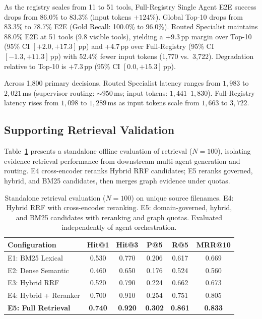 As the registry scales from 11 to 51 tools, Full-Registry Single Agent E2E success drops from 86.0\% to 83.3\% (input tokens $+124\%$). Global Top-10 drops from 83.3\% to 78.7\% E2E (Gold Recall: 100.0\% to 96.0\%). Routed Specialist maintains 88.0\% E2E at 51 tools (9.8 visible tools), yielding a +9.3\,pp margin over Top-10 (95\% CI $[+2.0, +17.3]$\,pp) and +4.7\,pp over Full-Registry (95\% CI $[-1.3, +11.3]$\,pp) with 52.4\% fewer input tokens (1{,}770 vs.\ 3{,}722). Degradation relative to Top-10 is $+7.3$\,pp (95\% CI $[0.0, +15.3]$\,pp).

Across 1,800 primary decisions, Routed Specialist latency ranges from $1{,}983$ to $2{,}021$\,ms (supervisor routing: ${\sim}950$\,ms; input tokens: $1{,}441$--$1{,}830$). Full-Registry latency rises from $1{,}098$ to $1{,}289$\,ms as input tokens scale from $1{,}663$ to $3{,}722$.

\subsection{Supporting Retrieval Validation}
\label{sec:retrieval_results}

Table~\ref{tab:retrieval_evaluation} presents a standalone offline evaluation of retrieval ($N{=}100$), isolating evidence retrieval performance from downstream multi-agent generation and routing. E4 cross-encoder reranks Hybrid RRF candidates; E5 reranks governed, hybrid, and BM25 candidates, then merges graph evidence under quotas.

\begin{table}[!htbp]
\centering
\caption{Standalone retrieval evaluation ($N{=}100$) on unique source filenames. E4: Hybrid RRF with cross-encoder reranking. E5: domain-governed, hybrid, and BM25 candidates with reranking and graph quotas. Evaluated independently of agent orchestration.}
\label{tab:retrieval_evaluation}
{\small\setlength{\tabcolsep}{5pt}
\begin{tabular}{lccccc}
\toprule
\textbf{Configuration} & \textbf{Hit@1} & \textbf{Hit@3} & \textbf{P@5} & \textbf{R@5} & \textbf{MRR@10} \\
\midrule
E1: BM25 Lexical          & 0.530 & 0.770 & 0.206 & 0.617 & 0.669 \\
E2: Dense Semantic        & 0.460 & 0.650 & 0.176 & 0.524 & 0.560 \\
E3: Hybrid RRF            & 0.520 & 0.790 & 0.224 & 0.662 & 0.673 \\
E4: Hybrid + Reranker     & 0.700 & 0.910 & 0.254 & 0.751 & 0.805 \\
\textbf{E5: Full Retrieval} & \textbf{0.740} & \textbf{0.920} & \textbf{0.302} & \textbf{0.861} & \textbf{0.833} \\
\bottomrule
\end{tabular}}
\end{table}

